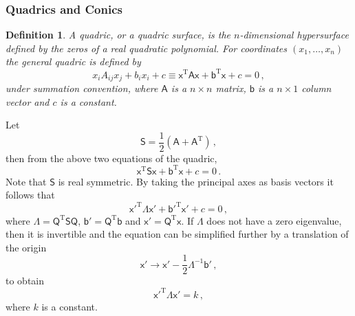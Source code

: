 \documentclass{article}
\theoremstyle{plain}\theoremheaderfont{\normalfont\itshape}\theorembodyfont{\rmfamily}\theoremseparator{.}\newtheorem*{rem}{Remark}\newtheorem*{ex}{Example}\newtheorem*{proof}{Proof}\newtheorem*{altp}{Alternative proof}
\theoremstyle{plain}\theoremheaderfont{\normalfont\bfseries}\theorembodyfont{\rmfamily}\theoremseparator{.}\newtheorem{thm}{Theorem}[section]\newtheorem{lem}[thm]{Lemma}\newtheorem{prop}[thm]{Proposition}\newtheorem*{cor}{Corollary}\newtheorem{defn}[thm]{Definition}\newtheorem{clm}[thm]{Claim}\newtheorem{clminproof}{Claim}
\theoremstyle{break}\theoremheaderfont{\normalfont\itshape}\theorembodyfont{\rmfamily}\theoremseparator{.\medskip}\newtheorem*{proofskip}{Proof}\newtheorem*{exs}{Examples}\newtheorem*{rems}{Remarks}
\theoremstyle{break}\theoremheaderfont{\normalfont\bfseries}\theorembodyfont{\rmfamily}\theoremseparator{.\medskip}\newtheorem{lemskip}[thm]{Lemma}\newtheorem{defnskip}[thm]{Definition}\newtheorem{propskip}[thm]{Proposition}\newtheorem{thmskip}[thm]{Theorem}
\numberwithin{equation}{section}
\newcommand{\tp}{^\mathrm{T}}
\begin{document}
	\subsubsection{Quadrics and Conics}
	\begin{defn}
		A \textit{quadric}, or a \textit{quadric surface}, is the \(n\)-dimensional hypersurface defined by the zeros of a real quadratic polynomial. For coordinates \((x_1,\dots,x_n)\) the general quadric is defined by
		\[x_iA_{ij}x_j+b_ix_i+c\equiv\mathsf{x\tp Ax+b\tp x}+c=0\,,\]
		under summation convention, where \(\mathsf{A}\) is a \(n\times n\) matrix, \(\mathsf{b}\) is a \(n\times 1\) column vector and \(c\) is a constant.
	\end{defn}
	Let
	\[\mathsf{S}=\frac{1}{2}(\mathsf{A+A\tp})\,,\]
	then from the above two equations of the quadric,
	\[\mathsf{x\tp Sx+b\tp x}+c=0\,.\]
	Note that \(\mathsf{S}\) is real symmetric. By taking the principal axes as basis vectors it follows that
	\[\mathsf{x'^{\mathrm{T}}\Lambda x'+b'^{\mathrm{T}}x'}+c=0\,,\]
	where \(\mathsf{\Lambda=Q\tp SQ}\), \(\mathsf{b'=Q\tp b}\) and \(\mathsf{x'=Q\tp x}\). If \(\mathsf{\Lambda}\) does not have a zero eigenvalue, then it is invertible and the equation can be simplified further by a translation of the origin
	\[\mathsf{x'\to x'}-\frac{1}{2}\mathsf{\Lambda}^{-1}\mathsf{b'}\,,\]
	to obtain
	\[\mathsf{x'^{\mathrm{T}}\Lambda x'}=k\,,\]
	where \(k\) is a constant.
	
\end{document}

